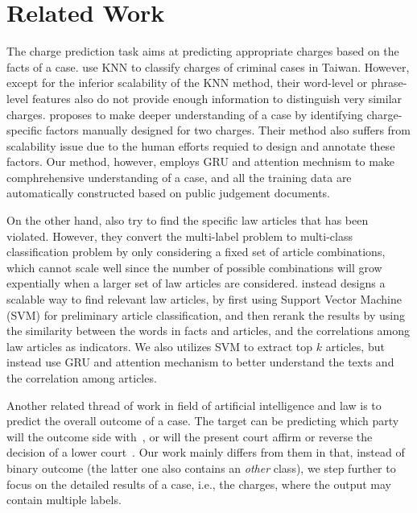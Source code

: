 \section{Related Work}
\label{sec_related_work}
The charge prediction task aims at predicting appropriate charges based on the facts of a case.
\cite{LIU2004case,liu2006exploring} use KNN to classify charges of criminal cases in Taiwan. However, except for the inferior scalability of the KNN method, their word-level or phrase-level features also do not provide enough information to distinguish very similar charges. 
\cite{lin2012exploiting} proposes to make deeper understanding of a case by identifying charge-specific factors manually designed for two charges. Their method also suffers from scalability issue due to the human efforts requied to design and annotate these factors. Our method, however, employs GRU and attention mechnism to make comphrehensive understanding of a case, and all the training data are automatically constructed based on public judgement documents. 

On the other hand,
\cite{liu2005classifying,liu2006exploring} also try to find the specific law articles that has been violated. However, they convert the multi-label problem to multi-class classification problem by only considering a fixed set of article combinations, which cannot scale well since the number of possible combinations will grow expentially when a larger set of law articles are considered.
\cite{liu2015predicting} instead designs a scalable way to find relevant law articles, 
by first using Support Vector Machine (SVM) for preliminary article classification, and then 
rerank the results by using the similarity between the words in facts and articles, and the correlations among law articles as indicators.
We also utilizes SVM to extract top $k$ articles, but instead use GRU and attention mechanism to better understand the texts and the correlation among articles.

Another related thread of work in field of artificial intelligence and law is to predict the overall outcome of a case. The target can be predicting which party will the outcome side with~\cite{aletras2016predicting}, or will the present court affirm or reverse the decision of a lower court~\cite{katz2016general}. Our work mainly differs from them in that, instead of binary outcome (the latter one also contains an \emph{other} class), we step further to focus on the detailed results of a case, i.e., the charges, where the output may contain multiple labels. 

